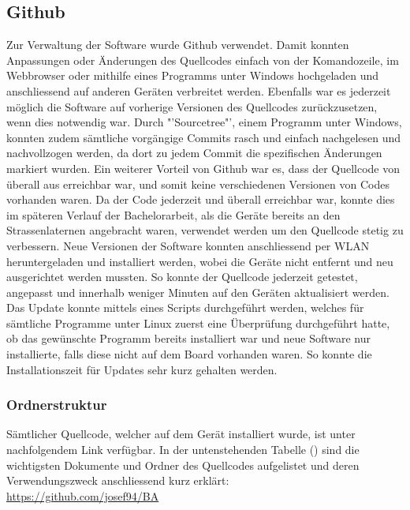 \subsection{Github}
Zur Verwaltung der Software wurde Github verwendet. Damit konnten Anpassungen oder Änderungen des Quellcodes einfach von der Komandozeile, im Webbrowser oder mithilfe eines Programms unter Windows hochgeladen und anschliessend auf anderen Geräten verbreitet werden. Ebenfalls war es jederzeit möglich die Software auf vorherige Versionen des Quellcodes zurückzusetzen, wenn dies notwendig war. Durch "'Sourcetree"', einem Programm unter Windows, konnten zudem sämtliche vorgängige Commits rasch und einfach nachgelesen und nachvollzogen werden, da dort zu jedem Commit die spezifischen Änderungen markiert wurden. Ein weiterer Vorteil von Github war es, dass der Quellcode von überall aus erreichbar war, und somit keine verschiedenen Versionen von Codes vorhanden waren. Da der Code jederzeit und überall erreichbar war, konnte dies im späteren Verlauf der Bachelorarbeit, als die Geräte bereits an den Strassenlaternen angebracht waren, verwendet werden um den Quellcode stetig zu verbessern. Neue Versionen der Software konnten anschliessend per WLAN heruntergeladen und installiert werden, wobei die Geräte nicht entfernt und neu ausgerichtet werden mussten. So konnte der Quellcode jederzeit getestet, angepasst und innerhalb weniger Minuten auf den Geräten aktualisiert werden. Das Update konnte mittels eines Scripts durchgeführt werden, welches für sämtliche Programme unter Linux zuerst eine Überprüfung durchgeführt hatte, ob das gewünschte Programm bereits installiert war und neue Software nur installierte, falls diese nicht auf dem Board vorhanden waren. So konnte die Installationszeit für Updates sehr kurz gehalten werden.

\subsubsection{Ordnerstruktur}
Sämtlicher Quellcode, welcher auf dem Gerät installiert wurde, ist unter nachfolgendem Link verfügbar. In der untenstehenden Tabelle () sind die wichtigsten Dokumente und Ordner des Quellcodes aufgelistet und deren Verwendungszweck anschliessend kurz erklärt:\\

\url{https://github.com/josef94/BA}\\

\setlength\tabcolsep{5pt}


